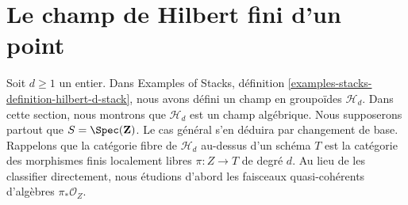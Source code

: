 









\section{Le champ de Hilbert fini d'un point}
\label{section-hilbert-point}

\noindent
Soit $d \geq 1$ un entier. Dans
Examples of Stacks, définition \ref{examples-stacks-definition-hilbert-d-stack},
nous avons défini un champ en groupoïdes $\mathcal{H}_d$.
Dans cette section, nous montrons que $\mathcal{H}_d$ est un
champ algébrique. Nous supposerons partout que
$S = \Spec(\mathbf{Z})$.
Le cas général s'en déduira par changement de base.
Rappelons que la catégorie fibre de $\mathcal{H}_d$ au-dessus d'un schéma $T$
est la catégorie des morphismes finis localement libres $\pi : Z \to T$ de
degré $d$. Au lieu de les classifier directement, nous étudions d'abord
les faisceaux quasi-cohérents d'algèbres $\pi_*\mathcal{O}_Z$.

